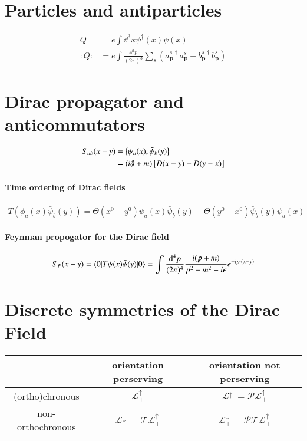 \section{Particles and antiparticles}
\begin{align}
	Q &= e \int \dd^3 x \psi^\dagger(x)\psi(x) \\
	:Q: &= e \int \frac{\dd^3 p}{(2\pi)^3} \sum_s (a_{\pmb{p}}^{s\,\dagger}a_{\pmb{p}}^s - b_{\pmb{p}}^{s\,\dagger}b_{\pmb{p}}^s)
\end{align}
\section{Dirac propagator and anticommutators}
\begin{align}
	\begin{split}
	S_{ab}(x-y) &= \left\{ \psi_a(x), \bar{\psi}_b(y) \right\} \\
				&= (i\slashed{\partial}+m) \left[ D(x-y)-D(y-x) \right]
	\end{split}
\end{align}
\paragraph{Time ordering of Dirac fields}
\begin{align}
	T(\phi_a(x)\bar{\psi}_b(y)) = \Theta(x^0 - y^0)\psi_a(x)\bar{\psi}_b(y) - \Theta(y^0 - x^0) \bar{\psi}_b(y)\psi_a(x)
\end{align}
\paragraph{Feynman propogator for the Dirac field}
\begin{align}
	S_F(x-y) = \braket{0| T \psi(x)\bar{\psi}(y) |0} = \int \frac{\dd^4 p}{(2\pi)^4} \frac{i(\slashed{p}+m)}{p^2-m^2+i\epsilon} e^{-ip\cdot(x-y)}
\end{align}

\section{Discrete symmetries of the Dirac Field}
\begin{center}
\begin{tabular}{c c c}
	\toprule
& orientation perserving & orientation not perserving \\
\midrule
	(ortho)chronous & $\mathcal{L}_+^{\uparrow}$ & $\mathcal{L}_-^\uparrow=\mathcal{P}\mathcal{L}_+^{\uparrow}$ \\
	non-orthochronous & $\mathcal{L}_-^\downarrow = \mathcal{T}\mathcal{L}_+^{\uparrow}$ & $\mathcal{L}_+^{\downarrow}=\mathcal{P}\mathcal{T}\mathcal{L}_+^{\uparrow}$ \\
	\bottomrule
\end{tabular}
\end{center}

